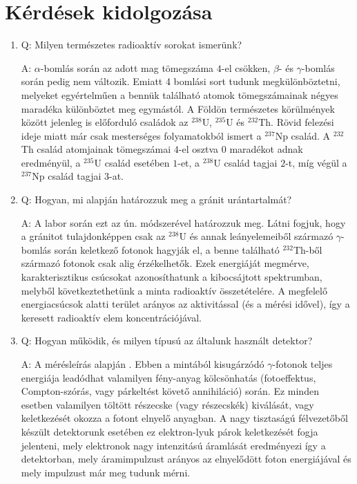 \section{Kérdések kidolgozása}
\begin{enumerate}
    \item Q: Milyen természetes radioaktív sorokat ismerünk?
    \begin{displayquote}
        A: $\alpha$-bomlás során az adott mag tömegszáma $4$-el csökken, $\beta$- és $\gamma$-bomlás során pedig nem változik. Emiatt 4 bomlási sort tudunk megkülönböztetni, melyeket egyértelműen a bennük található atomok tömegszámainak négyes maradéka különböztet meg egymástól. A Földön természetes körülmények között jelenleg is előforduló családok az $^{238}$U, $^{235}$U és $^{232}$Th. Rövid felezési ideje miatt már csak mesterséges folyamatokból ismert a $^{237}$Np család. A $^{232}$Th család atomjainak tömegszámai $4$-el osztva $0$ maradékot adnak eredményül, a $^{235}$U család esetében $1$-et, a $^{238}$U család tagjai $2$-t, míg végül a $^{237}$Np család tagjai 3-at.
    \end{displayquote}
    
    \item Q: Hogyan, mi alapján határozzuk meg a gránit urántartalmát?
    \begin{displayquote}
        A: A labor során ezt az ún.  módszerével határozzuk meg. Látni fogjuk, hogy a gránitot tulajdonképpen csak az $^{238}$U és annak leányelemeiből származó $\gamma$-bomlás során keletkező fotonok hagyják el, a benne található $^{232}$Th-ből származó fotonok csak alig érzékelhetők. Ezek energiáját megmérve, karakterisztikus csúcsokat azonosíthatunk a kibocsájtott spektrumban, melyből következtethetünk a minta radioaktív összetételére. A megfelelő energiacsúcsok alatti terület arányos az aktivitással (és a mérési idővel), így a keresett radioaktív elem koncentrációjával.
    \end{displayquote}
    
    \item Q: Hogyan működik, és milyen típusú az általunk használt detektor?
    \begin{displayquote}
        A: A mérésleírás alapján . Ebben a mintából kisugárzódó $\gamma$-fotonok teljes energiája leadódhat valamilyen fény-anyag kölcsönhatás (fotoeffektus, Compton-szórás, vagy párkeltést követő annihiláció) során. Ez minden esetben valamilyen töltött részecske (vagy részecskék) kiválását, vagy keletkezését okozza a fotont elnyelő anyagban. A nagy tisztaságú félvezetőből készült detektorunk esetében ez elektron-lyuk párok keletkezését fogja jelenteni, mely elektronok nagy intenzitású áramlását eredményezi így a detektorban, mely áramimpulzust arányos az elnyelődött foton energiájával és mely impulzust már meg tudunk mérni.
    \end{displayquote}
    

\end{enumerate}
